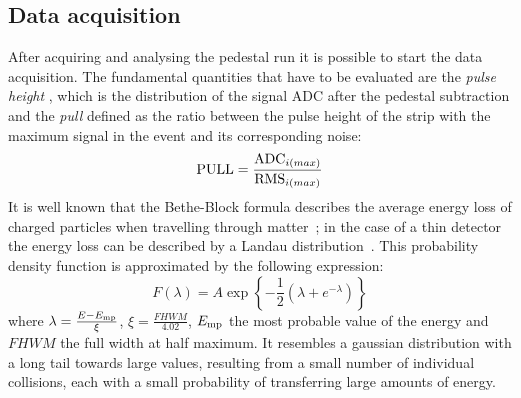 \subsection{Data acquisition}
After acquiring and analysing the pedestal run it is possible to start the data
acquisition. The fundamental quantities that have to be evaluated are the {\it
  pulse height} , which is the
distribution of the signal ADC after the pedestal subtraction and the {\it pull} defined as
the ratio between the pulse height of the strip with the maximum signal in the
event and its corresponding noise:
\begin{equation}
{\rm PULL} = \frac{{\rm ADC}_{i(max)}}{{\rm RMS}_{i(max)}}
\end{equation}
It is well known that the Bethe-Block formula describes the average energy loss
of charged particles when travelling through matter~\cite{Landau:1944if}; in the case of a thin
detector the energy loss can be described by a Landau
distribution~\cite{Bichsel:1988if}. This probability density
function is approximated by the following expression:
\begin{equation}\label{eq:landau}
  F(\lambda) = A\exp{\left\{-\frac{1}{2}\left(\lambda + e^{-\lambda} \right)\right\}}
\end{equation}
where $\lambda = \frac{E - E_{\rm mp}}{\xi}$, $\xi = \frac{FHWM}{4.02}$,
$E_{\rm mp}$ the most probable value of the energy and $FHWM$ the full width at
half maximum. It resembles a gaussian distribution with a long tail towards
large values, resulting from a small number of individual collisions, each with
a small probability of transferring large amounts of energy.\\
